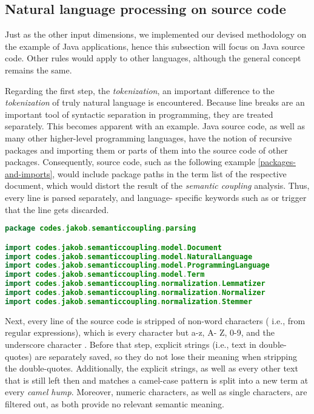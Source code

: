 \documentclass[12pt,a4paper]{report}
\begin{document}
\subsection{Natural language processing on source code}

Just as the other input dimensions, we implemented our devised methodology on
the example of Java applications, hence this subsection will focus on Java
source code. Other rules would apply to other languages, although the general
concept remains the same.

Regarding the first step, the \textit{tokenization}, an important difference to
the \textit{tokenization} of truly natural language is encountered. Because
line breaks are an important tool of syntactic separation in programming, they
are treated separately. This becomes apparent with an example. Java source
code, as well as many other higher-level programming languages, have the notion
of recursive packages and importing them or parts of them into the source code
of other packages. Consequently, source code, such as the following example
\ref{packages-and-imports}, would include package paths in the term list of the
respective document, which would distort the result of the \textit{semantic
coupling} analysis. Thus, every line is parsed separately, and language-
specific keywords such as  or  trigger that the line
gets discarded.

\begin{lstlisting}[caption=Packages and imports in Java, label=packages-and-imports, language=Java, breaklines=true]
package codes.jakob.semanticcoupling.parsing

import codes.jakob.semanticcoupling.model.Document
import codes.jakob.semanticcoupling.model.NaturalLanguage
import codes.jakob.semanticcoupling.model.ProgrammingLanguage
import codes.jakob.semanticcoupling.model.Term
import codes.jakob.semanticcoupling.normalization.Lemmatizer
import codes.jakob.semanticcoupling.normalization.Normalizer
import codes.jakob.semanticcoupling.normalization.Stemmer
\end{lstlisting}

Next, every line of the source code is stripped of non\hyp word characters (
i.e.,  from regular expressions), which is every character but a-z, A-
Z, 0-9, and the underscore character \cite{ieee1992posix}. Before that step,
explicit strings (i.e., text in double-quotes) are separately saved, so they do
not lose their meaning when stripping the double-quotes. Additionally, the
explicit strings, as well as every other text that is still left then and
matches a camel-case pattern is split into a new term at every \textit{camel
hump}. Moreover, numeric characters, as well as single characters, are filtered
out, as both provide no relevant semantic meaning.
\end{document}
